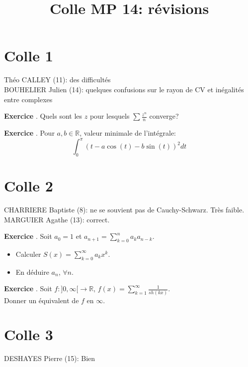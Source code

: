 \documentclass[10pt,a4paper]{article}
\title{Colle MP 14: révisions}
\newcounter{question}
\newcounter{exo}
\newenvironment{exo}{\vspace{0.5cm}\setcounter{question}{0}\addtocounter{exo}{1} \noindent \textbf{Exercice \theexo}. \normalsize }{\par}
\begin{document}
	\maketitle
	
	\section*{Colle 1}
	Théo CALLEY (11): des difficultés\\
	BOUHELIER Julien (14): quelques confusions sur le rayon de CV et inégalités entre complexes \\
	
	\begin{exo}
		Quels sont les $z$ pour lesquels $\sum \frac{z^n}{n}$ converge?
	\end{exo}
	
	\begin{exo}
		Pour $a, b \in \mathbb{R}$, valeur minimale de l'intégrale:
		$$\int_{0}^{\pi} (t - a \cos(t) - b \sin(t))^2 dt$$ 
	\end{exo}
	
	\section*{Colle 2}
	\setcounter{exo}{0}
	CHARRIERE Baptiste (8): ne se souvient pas de Cauchy-Schwarz. Très faible.\\
	MARGUIER Agathe (13): correct.\\
	
	\begin{exo}
		Soit $a_0 = 1$ et $a_{n+1} = \sum_{k=0}^{n} a_k a_{n-k}$.
		\begin{itemize}
			\item Calculer $S(x) = \sum_{k=0}^{\infty} a_k x^k$.
			\item En déduire $a_n$, $\forall n$.
		\end{itemize}
	\end{exo}

	\begin{exo}
		Soit $f : ]0, \infty[ \longrightarrow \mathbb{R}$, $f(x) = \sum_{k=1}^{\infty}	\frac{1}{sh(kx)}$.\\
		Donner un équivalent de $f$ en $\infty$.
	\end{exo}

	\section*{Colle 3}
	\setcounter{exo}{0}
	DESHAYES Pierre (15): Bien\\
	
\end{document}
